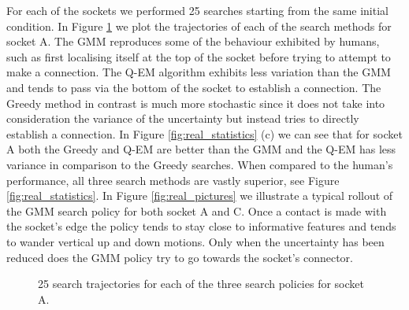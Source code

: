For each of the sockets we performed 25 searches starting from the same initial condition. In Figure \ref{fig:real_policy} we plot
the trajectories of each of the search methods for socket A. The GMM reproduces some of the behaviour exhibited by humans, such as 
first localising itself at the top of the socket before trying to attempt to make a connection. The Q-EM algorithm exhibits less variation
than the GMM and tends to pass via the bottom of the socket to establish a connection. The Greedy method in contrast is much more  
stochastic since it does not take into consideration the variance of the uncertainty  but instead tries to directly establish a connection.
In Figure \ref{fig:real_statistics} (c) we can see that for socket A both the Greedy and Q-EM are better than the GMM and the Q-EM has less
variance in comparison to the Greedy searches. When compared to the human's performance, all three search methods are vastly superior, 
see Figure \ref{fig:real_statistics}.  In Figure \ref{fig:real_pictures} we illustrate a typical rollout of the GMM search policy for both 
socket A and C. Once a contact is made with the socket's edge the policy tends to stay close to informative features and tends to 
wander vertical up and down motions. Only when the uncertainty has been reduced does the GMM policy try to go towards the socket's connector. 

\begin{figure}
 \centering
    \caption{%
    25 search trajectories for each of the three search policies for socket A. }
    \label{fig:real_policy}
\end{figure}


